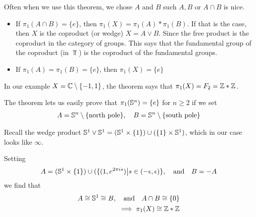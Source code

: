 
Often when we use this theorem, we chose $A$ and $B$ such $A,B$ or $A \cap B$ is nice.
\begin{itemize}
  \item If $\pi_1(A \cap B) = \{e\}$, then $\pi_1(X) = \pi_1(A) \ast \pi_1(B)$.
    If that is the case, then $X$ is the coproduct (or wedge) $X = A \vee B$.
    Since the free product is the coproduct in the category of groups. This says that the fundamental group of the coproduct (in $\Top$) is the coproduct of the fundamental groups.
  \item If $\pi_1(A) = \pi_1(B) = \{e\}$, then $\pi_1(X) = \{e\}$
\end{itemize}


In our example $X = \mathbb{C} \setminus \{-1,1\}$, the theorem says that $\pi_1(X) = F_2 = \mathbb{Z} \ast \mathbb{Z}$.

The theorem lets us easily prove that $\pi_1(\mathbb{S}^{n}) = \{e\}$ for $n \geq 2$ if we set 
\begin{align*}
  A = \mathbb{S}^{n} \setminus \{\text{north pole}\}, \quad B = \mathbb{S}^{n} \setminus \{\text{south pole}\}
\end{align*}


\begin{ex}[]
  Recall the wedge product $\mathbb{S}^{1} \vee\mathbb{S}^{1} = (\mathbb{S}^{1} \times \{1\}) \cup (\{1\} \times \mathbb{S}^{1})$, which in our case looks like $\infty$.

  Setting
  \begin{align*}
    A = (\mathbb{S}^{1} \times \{1\}) \cup (\{(1,e^{2 \pi i s}) \big\vert s \in (-\epsilon,\epsilon)\}
    , \quad \text{and} \quad
    B = -A
  \end{align*}
  we find that
  \begin{align*}
    A \cong \mathbb{S}^{1} \cong B, \quad \text{and} \quad A \cap B \cong \{0\}\\
    \implies \pi_1(X) \cong \mathbb{Z} \ast \mathbb{Z}
  \end{align*}
\end{ex}


